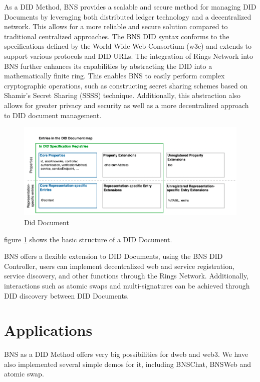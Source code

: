 \documentclass[twocolumn]{article}
\begin{document}
As a DID Method, BNS provides a scalable and secure method for managing DID Documents by leveraging both distributed ledger technology and a decentralized network. This allows for a more reliable and secure solution compared to traditional centralized approaches. The BNS DID syntax conforms to the specifications defined by the World Wide Web Consortium (w3c) and extends to support various protocols and DID URLs. The integration of Rings Network into BNS further enhances its capabilities by abstracting the DID into a mathematically finite ring. This enables BNS to easily perform complex cryptographic operations, such as constructing secret sharing schemes based on Shamir's Secret Sharing (SSSS) technique. Additionally, this abstraction also allows for greater privacy and security as well as a more decentralized approach to DID document management.


\begin{figure}[htbp]
  \includegraphics[width=\linewidth]{imgs/diddoc.png}
  \caption{Did Document}
  \label{diddoc}

\end{figure}

figure \ref{diddoc} shows the basic structure of a DID Document.

BNS offers a flexible extension to DID Documents, using the BNS DID Controller, users can implement decentralized web and service registration, service discovery, and other functions through the Rings Network. Additionally, interactions such as atomic swaps and multi-signatures can be achieved through DID discovery between DID Documents.


\section{Applications}

BNS as a DID Method offers very big possibilities for dweb and web3. We have also implemented several simple demos for it, including BNSChat, BNSWeb and atomic swap.
\end{document}
